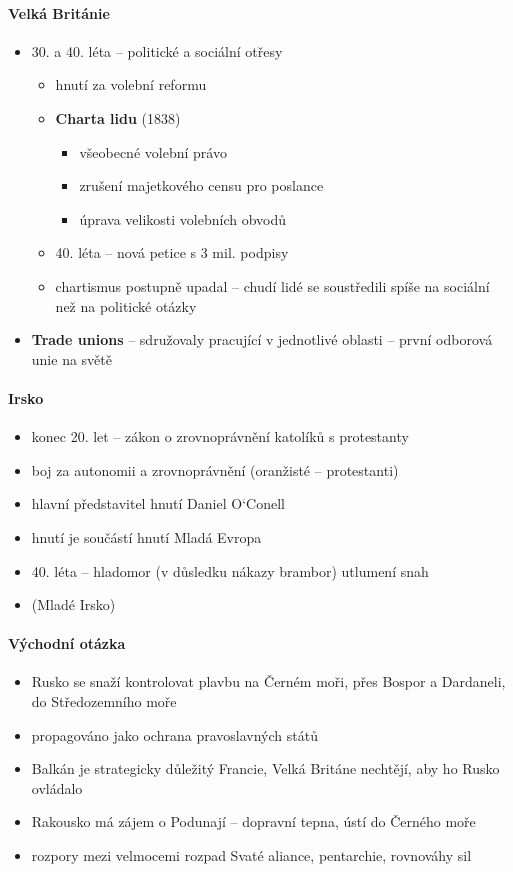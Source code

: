 \paragraph{Velká Británie}
\begin{itemize}
\item 30. a 40. léta -- politické a sociální otřesy
	\begin{itemize}
	\item hnutí za volební reformu
	\item \textbf{Charta lidu} (1838)
		\begin{itemize}
		\item všeobecné volební právo
		\item zrušení majetkového censu pro poslance
		\item úprava velikosti volebních obvodů
		\end{itemize}
	\item 40. léta -- nová petice s 3 mil. podpisy
	\item chartismus postupně upadal -- chudí lidé se soustředili spíše na sociální než na politické otázky
	\end{itemize}
\item \textbf{Trade unions} -- sdružovaly pracující v jednotlivé oblasti -- první odborová unie na světě
\end{itemize}

\paragraph{Irsko}
\begin{itemize}
\item konec 20. let -- zákon o zrovnoprávnění katolíků s protestanty
\item boj za autonomii a zrovnoprávnění (oranžisté -- protestanti)
\item hlavní představitel hnutí Daniel O`Conell 
\item hnutí je součástí hnutí Mladá Evropa
\item 40. léta -- hladomor (v důsledku nákazy brambor) \ra utlumení snah
\item {} (Mladé Irsko)
\end{itemize}

\paragraph{Východní otázka}
\begin{itemize}
\item Rusko se snaží kontrolovat plavbu na Černém moři, přes Bospor a Dardaneli, do Středozemního moře
\item propagováno jako ochrana pravoslavných států
\item Balkán je strategicky důležitý \ra Francie, Velká Británe nechtějí, aby ho Rusko ovládalo
\item Rakousko má zájem o Podunají -- dopravní tepna, ústí do Černého moře
\item[\ra] rozpory mezi velmocemi \ra rozpad Svaté aliance, pentarchie, rovnováhy sil
\end{itemize}

